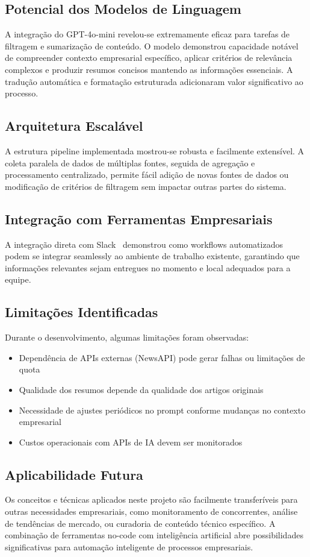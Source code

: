 \documentclass{sftex}
\begin{document}
\subsection{Potencial dos Modelos de Linguagem}
A integração do GPT-4o-mini revelou-se extremamente eficaz para tarefas de filtragem e sumarização de conteúdo. O modelo demonstrou capacidade notável de compreender contexto empresarial específico, aplicar critérios de relevância complexos e produzir resumos concisos mantendo as informações essenciais. A tradução automática e formatação estruturada adicionaram valor significativo ao processo.

\subsection{Arquitetura Escalável}
A estrutura pipeline implementada mostrou-se robusta e facilmente extensível. A coleta paralela de dados de múltiplas fontes, seguida de agregação e processamento centralizado, permite fácil adição de novas fontes de dados ou modificação de critérios de filtragem sem impactar outras partes do sistema.

\subsection{Integração com Ferramentas Empresariais}
A integração direta com Slack~\cite{slack_platform} demonstrou como workflows automatizados podem se integrar seamlessly ao ambiente de trabalho existente, garantindo que informações relevantes sejam entregues no momento e local adequados para a equipe.

\subsection{Limitações Identificadas}
Durante o desenvolvimento, algumas limitações foram observadas:
\begin{itemize}
    \item Dependência de APIs externas (NewsAPI) pode gerar falhas ou limitações de quota
    \item Qualidade dos resumos depende da qualidade dos artigos originais
    \item Necessidade de ajustes periódicos no prompt conforme mudanças no contexto empresarial
    \item Custos operacionais com APIs de IA devem ser monitorados
\end{itemize}

\subsection{Aplicabilidade Futura}
Os conceitos e técnicas aplicados neste projeto são facilmente transferíveis para outras necessidades empresariais, como monitoramento de concorrentes, análise de tendências de mercado, ou curadoria de conteúdo técnico específico. A combinação de ferramentas no-code com inteligência artificial abre possibilidades significativas para automação inteligente de processos empresariais.



\end{document}
